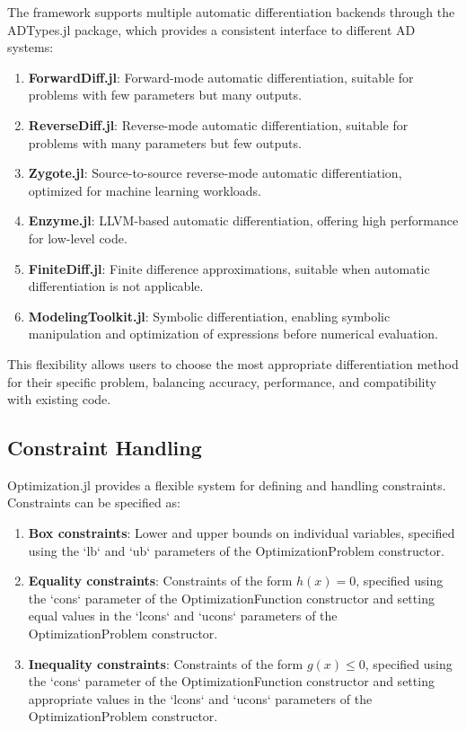 The framework supports multiple automatic differentiation backends through the ADTypes.jl package, which provides a consistent interface to different AD systems:

\begin{enumerate}
\item \textbf{ForwardDiff.jl}: Forward-mode automatic differentiation, suitable for problems with few parameters but many outputs.

\item \textbf{ReverseDiff.jl}: Reverse-mode automatic differentiation, suitable for problems with many parameters but few outputs.

\item \textbf{Zygote.jl}: Source-to-source reverse-mode automatic differentiation, optimized for machine learning workloads.

\item \textbf{Enzyme.jl}: LLVM-based automatic differentiation, offering high performance for low-level code.

\item \textbf{FiniteDiff.jl}: Finite difference approximations, suitable when automatic differentiation is not applicable.

\item \textbf{ModelingToolkit.jl}: Symbolic differentiation, enabling symbolic manipulation and optimization of expressions before numerical evaluation.
\end{enumerate}

This flexibility allows users to choose the most appropriate differentiation method for their specific problem, balancing accuracy, performance, and compatibility with existing code.

\subsection{Constraint Handling}

Optimization.jl provides a flexible system for defining and handling constraints. Constraints can be specified as:

\begin{enumerate}
\item \textbf{Box constraints}: Lower and upper bounds on individual variables, specified using the `lb` and `ub` parameters of the OptimizationProblem constructor.

\item \textbf{Equality constraints}: Constraints of the form $h(x) = 0$, specified using the `cons` parameter of the OptimizationFunction constructor and setting equal values in the `lcons` and `ucons` parameters of the OptimizationProblem constructor.

\item \textbf{Inequality constraints}: Constraints of the form $g(x) \leq 0$, specified using the `cons` parameter of the OptimizationFunction constructor and setting appropriate values in the `lcons` and `ucons` parameters of the OptimizationProblem constructor.
\end{enumerate}

